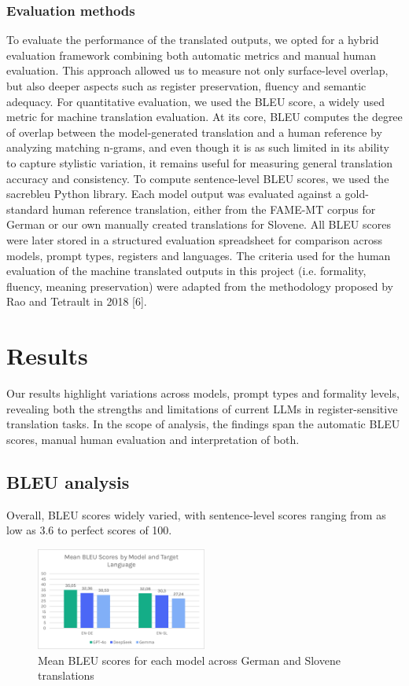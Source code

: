 \documentclass[fleqn,moreauthors,10pt]{ds_report}
\begin{document}
\subsubsection*{Evaluation methods}
To evaluate the performance of the translated outputs, we opted for a hybrid evaluation framework combining both automatic metrics and manual human evaluation. This approach allowed us to measure not only surface-level overlap, but also deeper aspects such as register preservation, fluency and semantic adequacy.
For quantitative evaluation, we used the BLEU score, a widely used metric for machine translation evaluation. At its core, BLEU computes the degree of overlap between the model-generated translation and a human reference by analyzing matching n-grams, and even though it is as such limited in its ability to capture stylistic variation, it remains useful for measuring general translation accuracy and consistency.
To compute sentence-level BLEU scores, we used the sacrebleu Python library. Each model output was evaluated against a gold-standard human reference translation, either from the FAME-MT corpus for German or our own manually created translations for Slovene. All BLEU scores were later stored in a structured evaluation spreadsheet for comparison across models, prompt types, registers and languages.
The criteria used for the human evaluation of the machine translated outputs in this project (i.e. formality, fluency, meaning preservation) were adapted from the methodology proposed by Rao and Tetrault in 2018 [6]. 



		\section*{Results}
		
	Our results highlight variations across models, prompt types and formality levels, revealing both the strengths and limitations of current LLMs in register-sensitive translation tasks. In the scope of analysis, the findings span the automatic BLEU scores, manual human evaluation and interpretation of both.
	
	\subsection*{BLEU analysis}

		Overall, BLEU scores widely varied, with sentence-level scores ranging from as low as 3.6 to perfect scores of 100.
		
	\begin{figure}[h]
		\centering
		\includegraphics[width=0.5\textwidth]{image2.png}
		\caption{Mean BLEU scores for each model across German and Slovene translations}		
		\label{Figure 1}
	\end{figure}
		
\end{document}
